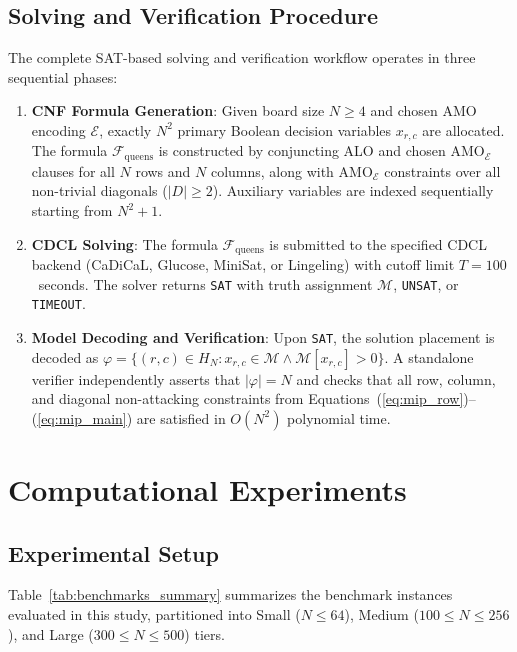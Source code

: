 \documentclass[a4paper,fleqn]{cas-sc}
\begin{document}
\subsection{Solving and Verification Procedure}
\label{sec:sat_procedure}

The complete SAT-based solving and verification workflow operates in three sequential phases:
\begin{enumerate}[label=(\arabic*),noitemsep]
    \item \textbf{CNF Formula Generation}: Given board size $N \ge 4$ and chosen AMO encoding $\mathcal{E}$, exactly $N^2$ primary Boolean decision variables $x_{r,c}$ are allocated. The formula $\mathcal{F}_{\text{queens}}$ is constructed by conjuncting ALO and chosen $\text{AMO}_{\mathcal{E}}$ clauses for all $N$ rows and $N$ columns, along with $\text{AMO}_{\mathcal{E}}$ constraints over all non-trivial diagonals ($|D| \ge 2$). Auxiliary variables are indexed sequentially starting from $N^2 + 1$.
    \item \textbf{CDCL Solving}: The formula $\mathcal{F}_{\text{queens}}$ is submitted to the specified CDCL backend (CaDiCaL, Glucose, MiniSat, or Lingeling) with cutoff limit $T = 100$~seconds. The solver returns \texttt{SAT} with truth assignment $\mathcal{M}$, \texttt{UNSAT}, or \texttt{TIMEOUT}.
    \item \textbf{Model Decoding and Verification}: Upon \texttt{SAT}, the solution placement is decoded as $\varphi = \{(r, c) \in H_N : x_{r,c} \in \mathcal{M} \wedge \mathcal{M}[x_{r,c}] > 0\}$. A standalone verifier independently asserts that $|\varphi| = N$ and checks that all row, column, and diagonal non-attacking constraints from Equations~(\ref{eq:mip_row})--(\ref{eq:mip_main}) are satisfied in $O(N^2)$ polynomial time.
\end{enumerate}

\section{Computational Experiments}
\label{sec:experiments}

\subsection{Experimental Setup}

Table~\ref{tab:benchmarks_summary} summarizes the benchmark instances evaluated in this study, partitioned into Small ($N \le 64$), Medium ($100 \le N \le 256$), and Large ($300 \le N \le 500$) tiers.
\end{document}
